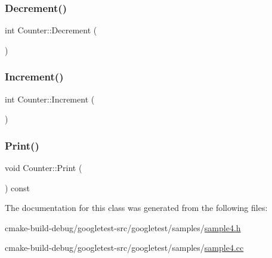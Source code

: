 \subsubsection{\texorpdfstring{Decrement()}{Decrement()}}
{\footnotesize\ttfamily int Counter\+::\+Decrement (\begin{DoxyParamCaption}{ }\end{DoxyParamCaption})}

\mbox{\label{classCounter_a0a0ca9fdb580a2aec9a5a62ebed2b5ab}} 
\subsubsection{\texorpdfstring{Increment()}{Increment()}}
{\footnotesize\ttfamily int Counter\+::\+Increment (\begin{DoxyParamCaption}{ }\end{DoxyParamCaption})}

\mbox{\label{classCounter_a80092ec2a0deea0870b2e9f8ad0906bd}} 
\subsubsection{\texorpdfstring{Print()}{Print()}}
{\footnotesize\ttfamily void Counter\+::\+Print (\begin{DoxyParamCaption}{ }\end{DoxyParamCaption}) const}



The documentation for this class was generated from the following files\+:\begin{DoxyCompactItemize}
\item 
cmake-\/build-\/debug/googletest-\/src/googletest/samples/\mbox{\hyperlink{sample4_8h}{sample4.\+h}}\item 
cmake-\/build-\/debug/googletest-\/src/googletest/samples/\mbox{\hyperlink{sample4_8cc}{sample4.\+cc}}\end{DoxyCompactItemize}
